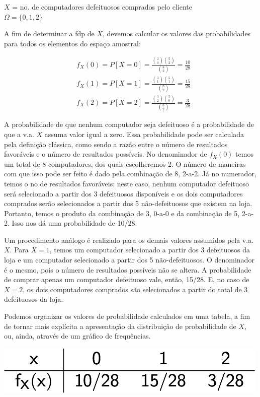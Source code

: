 \documentclass[
]{book}
\theoremstyle{definition}
\theoremstyle{definition}
\theoremstyle{definition}
\theoremstyle{remark}
\begin{document}
\(X\) = no. de computadores defeituosos comprados pelo cliente\\
\({\Omega = \{0,1,2\}}\)

A fim de determinar a fdp de \(X\), devemos calcular os valores das probabilidades para todos os elementos do espaço amostral:

\begin{align*}
 & f_X(0) = P[X=0] = \frac{\binom{3}{0}\binom{5}{2}}{\binom{8}{2}} = \frac{10}{28}\\
 & f_X(1) = P[X=1] = \frac{\binom{3}{1}\binom{5}{1}}{\binom{8}{2}} = \frac{15}{28}\\
 & f_X(2) = P[X=2] = \frac{\binom{3}{2}\binom{5}{0}}{\binom{8}{2}} = \frac{3}{28}
\end{align*}

A probabilidade de que nenhum computador seja defeituoso é a probabilidade de que a v.a. \(X\) assuma valor igual a zero. Essa probabilidade pode ser calculada pela definição clássica, como sendo a razão entre o número de resultados favoráveis e o número de resultados possíveis. No denominador de \(f_X(0)\) temos um total de 8 computadores, dos quais escolheremos 2. O número de maneiras com que isso pode ser feito é dado pela combinação de 8, 2-a-2. Já no numerador, temos o no de resultados favoráveis: neste caso, nenhum computador defeituoso será selecionado a partir dos 3 defeituosos disponíveis e os dois computadores comprados serão selecionados a partir dos 5 não-defeituosos que existem na loja. Portanto, temos o produto da combinação de 3, 0-a-0 e da combinação de 5, 2-a-2. Isso nos dá uma probabilidade de 10/28.

Um procedimento análogo é realizado para os demais valores assumidos pela v.a. \(X\). Para \(X=1\), temos um computador selecionado a partir dos 3 defeituosos da loja e um computador selecionado a partir dos 5 não-defeituosos. O denominador é o mesmo, pois o número de resultados possíveis não se altera. A probabilidade de comprar apenas um computador defeituoso vale, então, 15/28. E, no caso de \(X = 2\), os dois computadores comprados são selecionados a partir do total de 3 defeituosos da loja.

Podemos organizar os valores de probabilidade calculados em uma tabela, a fim de tornar mais explícita a apresentação da distribuição de probabilidade de \(X\), ou, ainda, através de um gráfico de frequências.

\includegraphics[width=0.5\linewidth]{img/comp-fdp}
\end{document}
